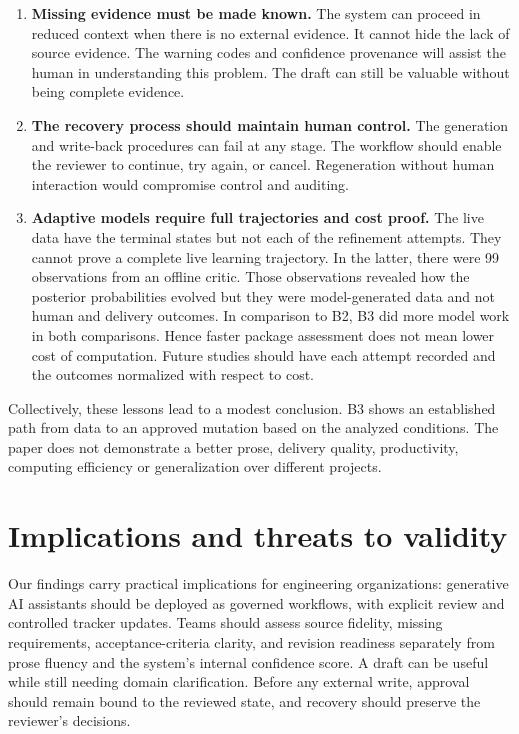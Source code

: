 \documentclass[pdflatex,sn-basic]{sn-jnl}
\begin{document}
\begin{enumerate}
  \item \textbf{Missing evidence must be made known.} The system can proceed in reduced context when there is no external evidence. It cannot hide the lack of source evidence. The warning codes and confidence provenance will assist the human in understanding this problem. The draft can still be valuable without being complete evidence.

  \item \textbf{The recovery process should maintain human control.} The generation and write-back procedures can fail at any stage. The workflow should enable the reviewer to continue, try again, or cancel. Regeneration without human interaction would compromise control and auditing.

  \item \textbf{Adaptive models require full trajectories and cost proof.} The live data have the terminal states but not each of the refinement attempts. They cannot prove a complete live learning trajectory. In the latter, there were 99 observations from an offline critic. Those observations revealed how the posterior probabilities evolved but they were model-generated data and not human and delivery outcomes. In comparison to B2, B3 did more model work in both comparisons. Hence faster package assessment does not mean lower cost of computation. Future studies should have each attempt recorded and the outcomes normalized with respect to cost.
\end{enumerate}

Collectively, these lessons lead to a modest conclusion. B3 shows an established path from data to an approved mutation based on the analyzed conditions. The paper does not demonstrate a better prose, delivery quality, productivity, computing efficiency or generalization over different projects.

\section{Implications and threats to validity}\label{sec:implications}
Our findings carry practical implications for engineering organizations: generative AI assistants should be deployed as governed workflows, with explicit review and controlled tracker updates. Teams should assess source fidelity, missing requirements, acceptance-criteria clarity, and revision readiness separately from prose fluency and the system's internal confidence score. A draft can be useful while still needing domain clarification. Before any external write, approval should remain bound to the reviewed state, and recovery should preserve the reviewer's decisions.
\end{document}
